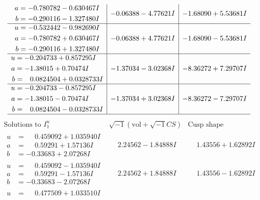 \documentclass[1p]{elsarticle_modified}
\theoremstyle{definition}
\newcommand{\I}{\sqrt{-1}}
\begin{document}
$$\begin{array}{c|c|c}
\begin{aligned}
a &= -0.780782 - 0.630467 I \\
b &= -0.290116 - 1.327480 I\end{aligned}
 & -0.06388 - 4.77621 I & -1.68090 + 5.53681 I \\ \hline\begin{aligned}
u &= -0.532442 - 0.982690 I \\
a &= -0.780782 + 0.630467 I \\
b &= -0.290116 + 1.327480 I\end{aligned}
 & -0.06388 + 4.77621 I & -1.68090 - 5.53681 I \\ \hline\begin{aligned}
u &= -0.204733 + 0.857295 I \\
a &= -1.38015 + 0.70474 I \\
b &= \phantom{-}0.0824504 + 0.0328733 I\end{aligned}
 & -1.37034 - 3.02368 I & -8.36272 + 7.29707 I \\ \hline\begin{aligned}
u &= -0.204733 - 0.857295 I \\
a &= -1.38015 - 0.70474 I \\
b &= \phantom{-}0.0824504 - 0.0328733 I\end{aligned}
 & -1.37034 + 3.02368 I & -8.36272 - 7.29707 I\\
 \hline 
 \end{array}$$\newpage$$\begin{array}{c|c|c}  
\text{Solutions to }I^u_{1}& \I (\text{vol} + \sqrt{-1}CS) & \text{Cusp shape}\\
 \hline 
\begin{aligned}
u &= \phantom{-}0.459092 + 1.035940 I \\
a &= \phantom{-}0.59291 + 1.57136 I \\
b &= -0.33683 + 2.07268 I\end{aligned}
 & \phantom{-}2.24562 - 1.84888 I & \phantom{-}1.43556 + 1.62892 I \\ \hline\begin{aligned}
u &= \phantom{-}0.459092 - 1.035940 I \\
a &= \phantom{-}0.59291 - 1.57136 I \\
b &= -0.33683 - 2.07268 I\end{aligned}
 & \phantom{-}2.24562 + 1.84888 I & \phantom{-}1.43556 - 1.62892 I \\ \hline\begin{aligned}
u &= \phantom{-}0.477509 + 1.033510 I \\

\end{aligned}
\end{array}$$
\end{document}
